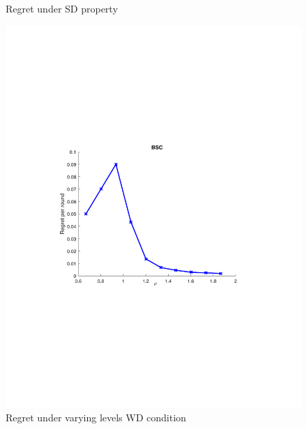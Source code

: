 \begin{center}
\begin{figure}[!bt]
\begin{minipage}{8cm}
				\vspace{-.3cm}
		\caption{\footnotesize Regret under SD property}
\label{fig:BSC_SD}
	\end{minipage}
	\begin{minipage}{8cm}
		\centering
		\includegraphics[scale=0.4]{../Simulations/Figures/BSC_WD1}
				\vspace{-.3cm}
		\caption{\footnotesize Regret under varying levels WD condition}
\label{fig:BSC_WD}
	\end{minipage}
%
\vspace{5pt}


\end{figure}
\end{center}
